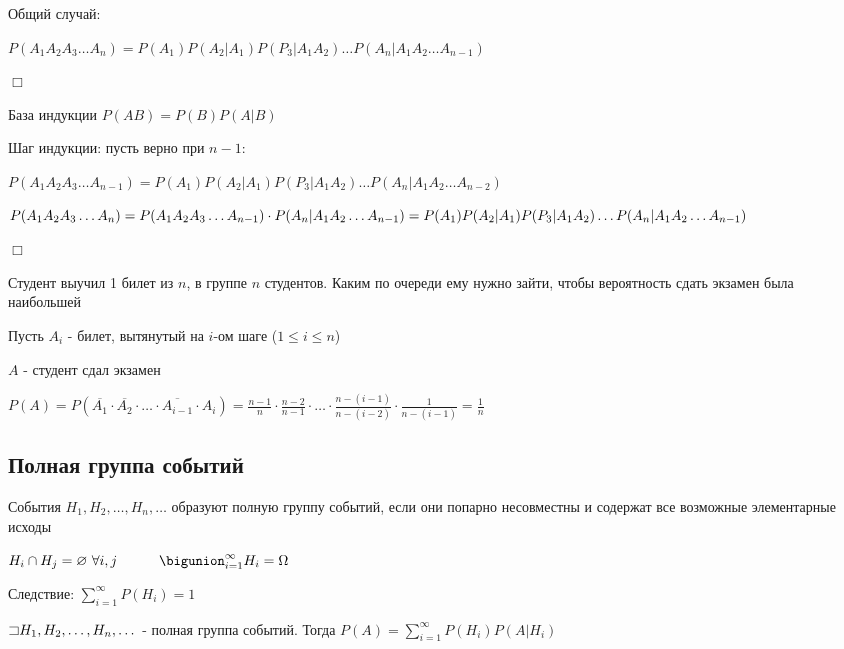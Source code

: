 \documentclass[12pt]{article}
\begin{document}
    Общий случай:

    $P(A_1 A_2 A_3 \dots A_n) = P(A_1) P(A_2 | A_1) P(P_3 | A_1 A_2) \dots P(A_n | A_1 A_2 \dots A_{n - 1})$

    \begin{tcolorbox}
        $\Box$

        База индукции $P(AB) = P(B) P(A|B)$

        Шаг индукции: пусть верно при $n - 1$:

        $P(A_1 A_2 A_3 \dots A_{n - 1}) = P(A_1) P(A_2 | A_1) P(P_3 | A_1 A_2) \dots P(A_n | A_1 A_2 \dots A_{n - 2})$

        $P(A_1 A_2 A_3 \dots A_n) = P(A_1 A_2 A_3 \dots A_{n - 1}) \cdot P(A_n | A_1 A_2 \dots A_{n - 1}) = \\
        P(A_1) P(A_2 | A_1) P(P_3 | A_1 A_2) \dots P(A_n | A_1 A_2 \dots A_{n - 1})$

        $\Box$
    \end{tcolorbox}


    \Ex Студент выучил 1 билет из $n$, в группе $n$ студентов. Каким по очереди ему нужно зайти, чтобы вероятность сдать экзамен была наибольшей

    Пусть $A_i$ - билет, вытянутый на $i$-ом шаге ($1 \leq i \leq n$)

    $A$ - студент сдал экзамен

    $P(A) = P(\overline{A_1} \cdot \overline{A_2} \cdot \dots \cdot \overline{A_{i - 1}} \cdot A_i) = \frac{n - 1}{n} \cdot \frac{n - 2}{n - 1} \cdot \dots \cdot \frac{n - (i - 1)}{n - (i - 2)} \cdot \frac{1}{n - (i - 1)} = \frac{1}{n}$

    \hypertarget{completegroupofevents}{}

    \subsection{Полная группа событий}

    \Def События $H_1, H_2, \dots, H_n, \dots$ образуют полную группу событий, если они попарно несовместны и содержат все возможные элементарные исходы

    $H_i \cap H_j = \emptyset \ \forall i, j \quad\quad\quad \bigunion_{i = 1}^{\infty} H_i = \Omega$

    Следствие: $\sum_{i = 1}^\infty P(H_i) = 1$

    \hypertarget{formulaofcompleteprobability}{}

    \begin{MyTheorem}
         $\mathord{\sqsupset} H_1, H_2, \dots, H_n, \dots$ - полная группа событий. Тогда $P(A) = \sum_{i = 1}^\infty P(H_i) P(A | H_i)$
    \end{MyTheorem}
\end{document}
